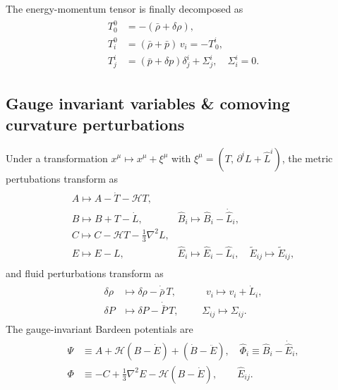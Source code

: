 The energy-momentum tensor is finally decomposed as
\begin{align}\label{eq:energy_momentum_tensor_decomposition}
\begin{aligned}
    T_{0}^{0} & =-(\bar{\rho}+\delta \rho), \\
    T_{i}^{0} & =(\bar{\rho}+\bar{p}) \,v_{i}=-T_{\,0}^{i}, \\
    T_{j}^{i} & =(\bar{p}+\delta p) \delta_{j}^{i}+\Sigma_{j}^{i}, \quad \Sigma_{i}^{i}=0.
\end{aligned}
\end{align}


\subsection{Gauge invariant variables \& comoving curvature perturbations}
Under a transformation $x^\mu \mapsto x^\mu +\xi^\mu$ with $\xi^\mu=(T,\,\partial^i L+\hat{L}^i)$, the metric pertubations transform as
\begin{align}
\begin{aligned}
    \begin{array}{ll}
    A \mapsto A-\dot{T}-\mathcal{H} T, & \\
    B \mapsto B+T-\dot{L}, & \hat{B}_{i} \mapsto \hat{B}_{i}-\dot{\hat{L}}_{i}, \\
    C \mapsto C-\mathcal{H} T-\frac{1}{3} \nabla^{2} L, & \\
    E \mapsto E-L, & \hat{E}_{i} \mapsto \hat{E}_{i}-\hat{L}_{i}, \quad \tilde{E}_{i j} \mapsto \tilde{E}_{i j},
    \end{array}
\end{aligned}
\end{align}
and fluid perturbations transform as
\begin{align}
\begin{aligned}
    \delta \rho & \mapsto \delta \rho-\dot{\bar{\rho}}\, T, \quad\qquad v_{i}  \mapsto v_{i}+\dot{L}_{i},\\[2pt]
    \delta P & \mapsto \delta P-\dot{\bar{P}}\, T, \,\,\qquad \Sigma_{i j}  \mapsto \Sigma_{i j}.
\end{aligned}
\end{align}
The gauge-invariant Bardeen potentials are
\begin{align}
\begin{aligned}
    \Psi & \equiv A+\mathcal{H}\left(B-\dot{E}\right)+\left(\dot{B}-\ddot{E}\right), \quad \hat{\Phi}_{i} \equiv \hat{B}_{i}-\dot{\hat{E}}_{i}, \\
    \Phi & \equiv-C+\frac{1}{3} \nabla^{2} E-\mathcal{H}\left(B-\dot{E}\right), \qquad \hat{E}_{i j}.
\end{aligned}
\end{align}
